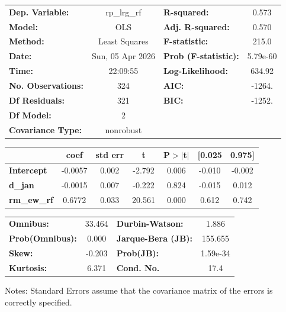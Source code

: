 \begin{center}
\begin{tabular}{lclc}
\toprule
\textbf{Dep. Variable:}    &   rp\_lrg\_rf    & \textbf{  R-squared:         } &     0.573   \\
\textbf{Model:}            &       OLS        & \textbf{  Adj. R-squared:    } &     0.570   \\
\textbf{Method:}           &  Least Squares   & \textbf{  F-statistic:       } &     215.0   \\
\textbf{Date:}             & Sun, 05 Apr 2026 & \textbf{  Prob (F-statistic):} &  5.79e-60   \\
\textbf{Time:}             &     22:09:55     & \textbf{  Log-Likelihood:    } &    634.92   \\
\textbf{No. Observations:} &         324      & \textbf{  AIC:               } &    -1264.   \\
\textbf{Df Residuals:}     &         321      & \textbf{  BIC:               } &    -1252.   \\
\textbf{Df Model:}         &           2      & \textbf{                     } &             \\
\textbf{Covariance Type:}  &    nonrobust     & \textbf{                     } &             \\
\bottomrule
\end{tabular}
\begin{tabular}{lcccccc}
                    & \textbf{coef} & \textbf{std err} & \textbf{t} & \textbf{P$> |$t$|$} & \textbf{[0.025} & \textbf{0.975]}  \\
\midrule
\textbf{Intercept}  &      -0.0057  &        0.002     &    -2.792  &         0.006        &       -0.010    &       -0.002     \\
\textbf{d\_jan}     &      -0.0015  &        0.007     &    -0.222  &         0.824        &       -0.015    &        0.012     \\
\textbf{rm\_ew\_rf} &       0.6772  &        0.033     &    20.561  &         0.000        &        0.612    &        0.742     \\
\bottomrule
\end{tabular}
\begin{tabular}{lclc}
\textbf{Omnibus:}       & 33.464 & \textbf{  Durbin-Watson:     } &    1.886  \\
\textbf{Prob(Omnibus):} &  0.000 & \textbf{  Jarque-Bera (JB):  } &  155.655  \\
\textbf{Skew:}          & -0.203 & \textbf{  Prob(JB):          } & 1.59e-34  \\
\textbf{Kurtosis:}      &  6.371 & \textbf{  Cond. No.          } &     17.4  \\
\bottomrule
\end{tabular}
\end{center}

Notes: \newline
 [1] Standard Errors assume that the covariance matrix of the errors is correctly specified.